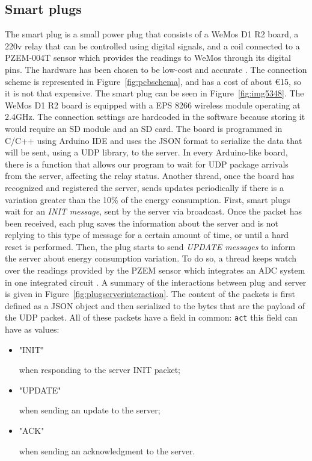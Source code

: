\documentclass[conference]{IEEEtran}
\begin{document}
	\subsection{Smart plugs}\label{SP}
	The smart plug is a small power plug that consists of a WeMos D1 R2 board, a 220v relay that can be controlled using digital signals, and a coil connected to a PZEM-004T sensor \cite{8442052} \cite{8250475}  which provides the readings to WeMos through its digital pins. The hardware has been chosen to be low-cost and accurate \cite{8442066}.
	The connection scheme is represented in Figure~\ref{fig:pcbschema}, and has a cost of about €15, so it is not that expensive. The smart plug can be seen in Figure~\ref{fig:img5348}.
	The WeMos D1 R2 board is equipped with a EPS 8266 wireless module operating at 2.4GHz. The connection settings are hardcoded in the software because storing it would require an SD module and an SD card. The board is programmed in C/C++ using Arduino IDE and uses the JSON format to serialize the data that will be sent, using a UDP library, to the server.
	In every Arduino-like board, there is a function that allows our program to wait for UDP package arrivals from the server, affecting the relay status.
	Another thread, once the board has recognized and registered the server, sends updates periodically if there is a variation greater than the 10\% of the energy consumption.
	First, smart plugs wait for an \textit{INIT message}, sent by the server via broadcast. Once the packet has been received, each plug saves the information about the server and is not replying to this type of message for a certain amount of time, or until a hard reset is performed. 
	Then, the plug starts to send \textit{UPDATE messages} to inform the server about energy consumption variation. To do so, a thread keeps watch over the readings provided by the PZEM sensor which integrates an ADC  system  in one integrated circuit \cite{8612412}.
	A summary of the interactions between plug and server is given in Figure~\ref{fig:plugserverinteraction}.
	The content of the packets is first defined as a JSON object and then serialized to the bytes that are the payload of the UDP packet. All of these packets have a field in common: \verb|act| this field can have as values:
	\begin{itemize}
		\item \begin{spverbatim}"INIT"\end{spverbatim} when responding to the server INIT packet;
		\item \begin{spverbatim}"UPDATE"\end{spverbatim} when sending an update to the server;
		\item \begin{spverbatim}"ACK"\end{spverbatim} when sending an acknowledgment to the server.
	\end{itemize}
\end{document}

